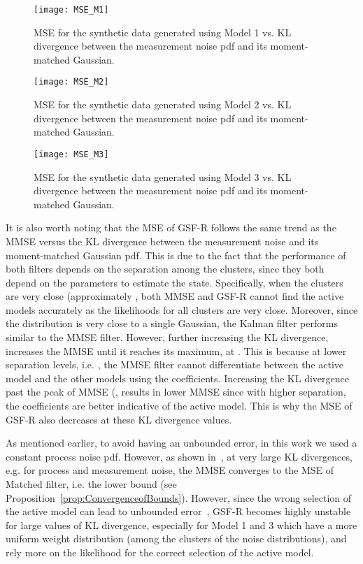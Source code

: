 \documentclass[10pt,twocolumn,twoside]{IEEEtran}
\newcommand{\corcol}[1]{\textcolor{CorCol}{#1}}
\begin{document}
\begin{figure}[!t]
\centering
\texttt{[image: MSE\_M1]}
\caption{MSE for the synthetic data generated using Model 1 vs. KL divergence between the measurement noise pdf and its moment-matched Gaussian.}
\label{fig:MSEM1}
\end{figure}
\begin{figure}[!t]
\centering
\texttt{[image: MSE\_M2]}
\caption{MSE for the synthetic data generated using Model 2 vs. KL divergence between the measurement noise pdf and its moment-matched Gaussian.}
\label{fig:MSEM2}
\end{figure}
\begin{figure}[!t]
\centering
\texttt{[image: MSE\_M3]}
\caption{MSE for the synthetic data generated using Model 3 vs. KL divergence between the measurement noise pdf and its moment-matched Gaussian.}
\label{fig:MSEM3}
\end{figure}

It is also worth noting that the MSE of GSF-R follows the same trend as the MMSE versus the KL divergence between the measurement noise and its moment-matched Gaussian pdf. This is due to the fact that the performance of both filters depends on the separation among the clusters, since they both depend on the parameters  to estimate the state. Specifically, when the clusters are very close (approximately , both MMSE and GSF-R cannot find the active models accurately as the likelihoods for all clusters are very close. Moreover, since the distribution is very close to a single Gaussian, \corcol{the }Kalman filter performs similar to the MMSE filter. However, further increasing the KL divergence, increases the MMSE until it reaches its maximum, at \corcol{}. This is because at lower separation levels, i.e. , the MMSE filter cannot differentiate between the active model and the other models using the coefficients. Increasing the KL divergence past the peak of MMSE (, results in lower MMSE since with higher separation, the coefficients are better indicative of the active model. This is why the MSE of GSF-R also decreases at these KL divergence values.

As mentioned earlier, to avoid having an unbounded error, in this work we used a constant process noise pdf. However, as shown in~\cite{pishdad_approximate_2014}, at very large KL divergences, e.g.  for process and measurement noise, the MMSE converges to the MSE of Matched filter, i.e. the lower bound (see Proposition~\ref{prop:ConvergenceofBounds}). However, since the wrong selection of the active model can lead to unbounded error~\cite{bar2001estimation}, GSF-R becomes highly unstable for large values of KL divergence, especially for Model 1 and 3 which have a more uniform weight distribution (among the clusters of the noise distributions), and rely more on the likelihood for the correct selection of the active model.
\end{document}
